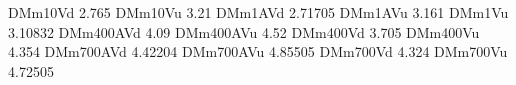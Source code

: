 DMm10Vd 2.765
DMm10Vu 3.21
DMm1AVd 2.71705
DMm1AVu 3.161
DMm1Vu 3.10832
DMm400AVd 4.09
DMm400AVu 4.52
DMm400Vd 3.705
DMm400Vu 4.354
DMm700AVd 4.42204
DMm700AVu 4.85505
DMm700Vd 4.324
DMm700Vu 4.72505
